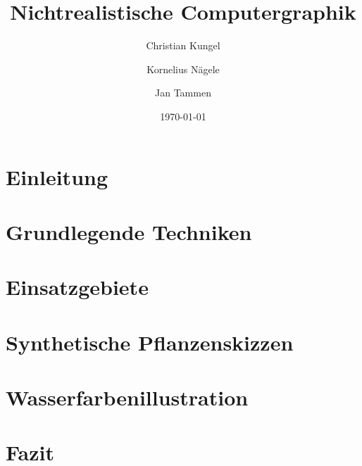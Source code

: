 \documentclass[
	a4paper,     		%
	headsepline, 		%
	footsepline, 		%
	titlepage,   		%
	12pt,        		%
]{scrreprt}
\title{Nichtrealistische Computergraphik}
\author{%
	Christian Kungel
	\and{%
		Kornelius Nägele
	}%
	\and{%
		Jan Tammen
	}%
}%
\date{\today}
\begin{document}
\maketitle

\tableofcontents



\chapter{Einleitung}


\chapter{Grundlegende Techniken}


\chapter{Einsatzgebiete}


\chapter{Synthetische Pflanzenskizzen}


\chapter{Wasserfarbenillustration}


\chapter{Fazit}







\renewcommand{\bibname}{Quellen}



\end{document}
